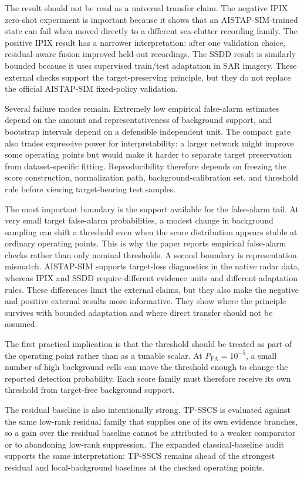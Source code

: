 \documentclass[journal]{IEEEtran}
\begin{document}
The result should not be read as a universal transfer claim. The negative IPIX zero-shot experiment is important because it shows that an AISTAP-SIM-trained state can fail when moved directly to a different sea-clutter recording family. The positive IPIX result has a narrower interpretation: after one validation choice, residual-aware fusion improved held-out recordings. The SSDD result is similarly bounded because it uses supervised train/test adaptation in SAR imagery. These external checks support the target-preserving principle, but they do not replace the official AISTAP-SIM fixed-policy validation.

Several failure modes remain. Extremely low empirical false-alarm estimates depend on the amount and representativeness of background support, and bootstrap intervals depend on a defensible independent unit. The compact gate also trades expressive power for interpretability: a larger network might improve some operating points but would make it harder to separate target preservation from dataset-specific fitting. Reproducibility therefore depends on freezing the score construction, normalization path, background-calibration set, and threshold rule before viewing target-bearing test samples.

The most important boundary is the support available for the false-alarm tail. At very small target false-alarm probabilities, a modest change in background sampling can shift a threshold even when the score distribution appears stable at ordinary operating points. This is why the paper reports empirical false-alarm checks rather than only nominal thresholds. A second boundary is representation mismatch. AISTAP-SIM supports target-loss diagnostics in the native radar data, whereas IPIX and SSDD require different evidence units and different adaptation rules. These differences limit the external claims, but they also make the negative and positive external results more informative. They show where the principle survives with bounded adaptation and where direct transfer should not be assumed.

The first practical implication is that the threshold should be treated as part of the operating point rather than as a tunable scalar. At $P_{\mathrm{FA}}=10^{-5}$, a small number of high background cells can move the threshold enough to change the reported detection probability. Each score family must therefore receive its own threshold from target-free background support.

The residual baseline is also intentionally strong. TP-SSCS is evaluated against the same low-rank residual family that supplies one of its own evidence branches, so a gain over the residual baseline cannot be attributed to a weaker comparator or to abandoning low-rank suppression. The expanded classical-baseline audit supports the same interpretation: TP-SSCS remains ahead of the strongest residual and local-background baselines at the checked operating points.
\end{document}

